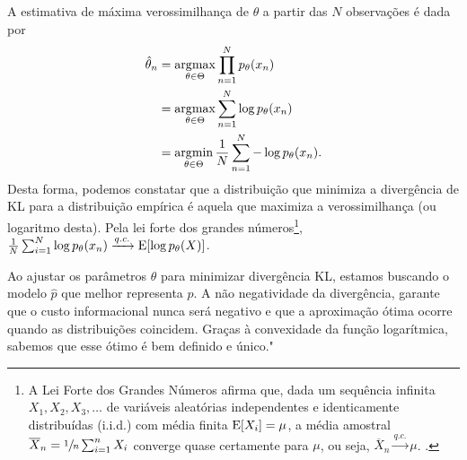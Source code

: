 A estimativa de máxima verossimilhança de $\theta$ a partir das $N$ observações é dada por
\begin{subequations}\label{eq:dvmleextm}
\begin{align}
\hat{\theta}_n &= \operatorname*{\arg\!\max}_{\theta \in \Theta} \prod_{n=1}^{N} p_\theta(x_n) \\
               &= \operatorname*{\arg\!\max}_{\theta \in \Theta} \sum_{n=1}^{N} \log p_\theta(x_n) \\
               &= \operatorname*{\arg\!\min}_{\theta \in \Theta} \frac{1}{N} \sum_{n=1}^{N} - \log p_\theta(x_n) .
\end{align}
\end{subequations}
Desta forma, podemos constatar que a distribuição que minimiza a divergência de KL para a distribuição empírica é
aquela que maximiza a verossimilhança (ou logaritmo desta).
Pela lei forte dos grandes números\footnote{
A Lei Forte dos Grandes Números afirma que, dada um sequência infinita 
$X_1, X_2, X_3, \ldots$ de variáveis aleatórias independentes e identicamente distribuídas (i.i.d.) 
com média finita $\mathrm{E}[X_i]=\mu$, a média amostral $\overline{X}_n = \sfrac{1}{n}\sum_{i=1}^{n} X_i$
converge quase certamente para $\mu$, ou seja, $\overline{X}_n \xrightarrow{q.c.} \mu$. 
.
}, $\frac{1}{N} \sum_{i=1}^{N} \log p_\theta(x_n) \xrightarrow{q.c.} \mathrm{E}[ \log p_\theta(X) ]$.

Ao ajustar os parâmetros $\theta$ para minimizar divergência KL, estamos buscando o modelo $\hat{p}$
que melhor representa $p$. A não negatividade da divergência, garante que o custo informacional 
nunca será negativo e que a aproximação ótima ocorre quando as distribuições coincidem.
Graças à convexidade da função logarítmica, sabemos que esse ótimo é bem definido e único."

